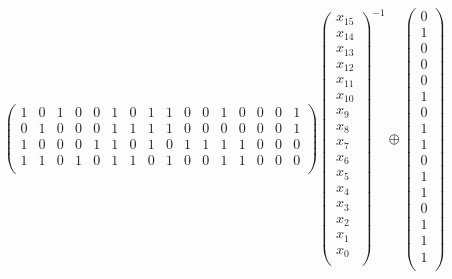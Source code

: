 \begin{frame}
\begin{equation*}
\begin{pmatrix}
1 & 0 & 1 & 0 & 0 & 1 & 0 & 1 & 1 & 0 & 0 & 1 & 0 & 0 & 0 & 1 \\
0 & 1 & 0 & 0 & 0 & 1 & 1 & 1 & 1 & 0 & 0 & 0 & 0 & 0 & 0 & 1 \\
1 & 0 & 0 & 0 & 1 & 1 & 0 & 1 & 0 & 1 & 1 & 1 & 1 & 0 & 0 & 0 \\
1 & 1 & 0 & 1 & 0 & 1 & 1 & 0 & 1 & 0 & 0 & 1 & 1 & 0 & 0 & 0 \\
\end{pmatrix}
\begin{pmatrix}
x_{15} \\
x_{14} \\
x_{13} \\
x_{12} \\
x_{11} \\
x_{10} \\
x_{9} \\
x_{8} \\
x_{7} \\
x_{6} \\
x_{5} \\
x_{4} \\
x_{3} \\
x_{2} \\
x_{1} \\
x_{0} \\
\end{pmatrix}
^{-1}
\oplus
\begin{pmatrix}
0 \\
1 \\
0 \\
0 \\
0 \\
1 \\
0 \\
1 \\
1 \\
0 \\
1 \\
1 \\
0 \\
1 \\
1 \\
1 \\
\end{pmatrix}
\end{equation*}
\end{frame}

